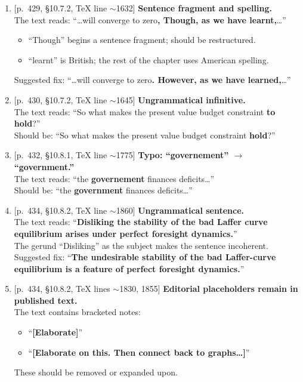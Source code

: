 \documentclass[11pt]{article}
\newcommand{\Err}[1]{\textbf{\color{red}#1}}
\newcommand{\Fix}[1]{\textbf{\color{green!50!black}#1}}
\newcommand{\loc}[1]{\textsf{\small [#1]}}
\begin{document}
\begin{enumerate}[label=\textbf{G\arabic*.}, leftmargin=2em]
\item \loc{p.~429, \S10.7.2, TeX line $\sim$1632}
\textbf{Sentence fragment and spelling.}\\
The text reads: ``\ldots will converge to zero\Err{, Though, as we have learnt,}\ldots''\\
\begin{itemize}
  \item ``Though'' begins a sentence fragment; should be restructured.
  \item ``learnt'' is British; the rest of the chapter uses American spelling.
\end{itemize}
Suggested fix: ``\ldots will converge to zero\Fix{. However, as we have learned,}\ldots''

\item \loc{p.~430, \S10.7.2, TeX line $\sim$1645}
\textbf{Ungrammatical infinitive.}\\
The text reads: ``So what makes the present value budget constraint \Err{to hold}?''\\
Should be: ``So what makes the present value budget constraint \Fix{hold}?''

\item \loc{p.~432, \S10.8.1, TeX line $\sim$1775}
\textbf{Typo: ``governement'' $\to$ ``government.''}\\
The text reads: ``the \Err{governement} finances deficits\ldots''\\
Should be: ``the \Fix{government} finances deficits\ldots''

\item \loc{p.~434, \S10.8.2, TeX line $\sim$1860}
\textbf{Ungrammatical sentence.}\\
The text reads: ``\Err{Disliking the stability of the bad Laffer curve equilibrium arises under perfect foresight dynamics.}''\\
The gerund ``Disliking'' as the subject makes the sentence incoherent.\\
Suggested fix: ``\Fix{The undesirable stability of the bad Laffer-curve equilibrium is a feature of perfect foresight dynamics.}''

\item \loc{p.~434, \S10.8.2, TeX lines $\sim$1830, 1855}
\textbf{Editorial placeholders remain in published text.}\\
The text contains bracketed notes:
\begin{itemize}
  \item ``\Err{[Elaborate]}''
  \item ``\Err{[Elaborate on this. Then connect back to graphs\ldots]}''
\end{itemize}
These should be removed or expanded upon.


\end{enumerate}
\end{document}
